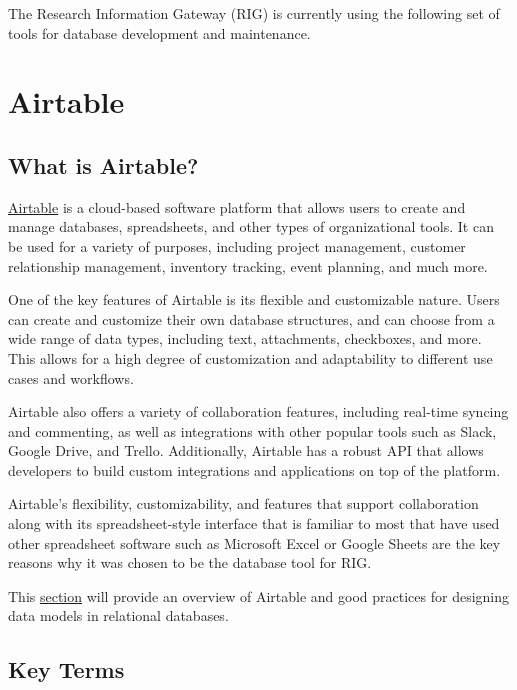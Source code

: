 \documentclass[
]{book}
\begin{document}
The Research Information Gateway (RIG) is currently using the following set of tools for database development and maintenance.

\hypertarget{airtable}{%
\section{Airtable}\label{airtable}}

\hypertarget{what-is-airtable}{%
\subsection{What is Airtable?}\label{what-is-airtable}}

\href{https://airtable.com}{Airtable} is a cloud-based software platform that allows users to create and manage databases, spreadsheets, and other types of organizational tools. It can be used for a variety of purposes, including project management, customer relationship management, inventory tracking, event planning, and much more.

One of the key features of Airtable is its flexible and customizable nature. Users can create and customize their own database structures, and can choose from a wide range of data types, including text, attachments, checkboxes, and more. This allows for a high degree of customization and adaptability to different use cases and workflows.

Airtable also offers a variety of collaboration features, including real-time syncing and commenting, as well as integrations with other popular tools such as Slack, Google Drive, and Trello. Additionally, Airtable has a robust API that allows developers to build custom integrations and applications on top of the platform.

Airtable's flexibility, customizability, and features that support collaboration along with its spreadsheet-style interface that is familiar to most that have used other spreadsheet software such as Microsoft Excel or Google Sheets are the key reasons why it was chosen to be the database tool for RIG.

This \protect\hyperlink{airtable}{section} will provide an overview of Airtable and good practices for designing data models in relational databases.

\hypertarget{key-terms}{%
\subsection{Key Terms}\label{key-terms}}
\end{document}
